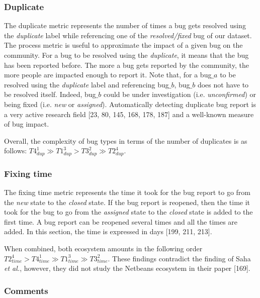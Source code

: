 \documentclass[12pt]{report}
\begin{document}
\subsubsection{Duplicate}\label{duplicate}

The duplicate metric represents the number of times a bug gets resolved
using the \emph{duplicate} label while referencing one of the
\emph{resolved/fixed} bug of our dataset. The process metric is useful
to approximate the impact of a given bug on the community. For a bug to
be resolved using the \emph{duplicate}, it means that the bug has been
reported before. The more a bug gets reported by the community, the more
people are impacted enough to report it. Note that, for a bug\(\_a\) to
be resolved using the \emph{duplicate} label and referencing bug\(\_b\),
bug\(\_b\) does not have to be resolved itself. Indeed, bug\(\_b\) could
be under investigation (i.e. \emph{unconfirmed}) or being fixed (i.e.
\emph{new} or \emph{assigned}). Automatically detecting duplicate bug
report is a very active research field {[}23, 80, 145, 168, 178, 187{]}
and a well-known measure of bug impact.

Overall, the complexity of bug types in terms of the number of
duplicates is as follows:
\(T4_{dup}^{1} \gg T1_{dup}^{3} > T3_{dup}^{2} \gg T2_{dup}^{4}\).

\subsubsection{Fixing time}\label{fixing-time}

The fixing time metric represents the time it took for the bug report to
go from the \emph{new} state to the \emph{closed} state. If the bug
report is reopened, then the time it took for the bug to go from the
\emph{assigned} state to the \emph{closed} state is added to the first
time. A bug report can be reopened several times and all the times are
added. In this section, the time is expressed in days {[}199, 211,
213{]}.

When combined, both ecosystem amounts in the following order
\(T2_{time}^4 > T4_{time}^1 \gg T1_{time}^3 \gg T3_{time}^2\). These
findings contradict the finding of Saha \emph{et al.}, however, they did
not study the Netbeans ecosystem in their paper {[}169{]}.

\subsubsection{Comments}\label{comments}
\end{document}
